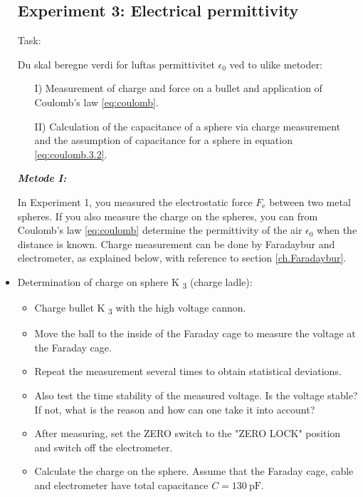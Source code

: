 \documentclass[../Elmag-labhefte-2020.tex]{subfiles}
\begin{document}
\begin{itemize}
\subsection{Experiment 3: Electrical permittivity}

Task: \ \
{\itsf Du skal beregne verdi for luftas permittivitet $\epsilon_0$ ved to ulike metoder:

\vspace{-4mm}
\begin{itemize}
    \item [I)] Measurement of charge and force on a bullet and application of Coulomb's law \eqref{eq:coulomb}.
    \item [II)] Calculation of the capacitance of a sphere via charge measurement and the assumption of capacitance for a sphere in equation \eqref{eq:coulomb.3.2}.
\end{itemize}
}

\textbf{\emph{Metode I:}}

In Experiment 1, you measured the electrostatic force $F_\text{e}$ between two metal spheres. If you also measure the charge on the spheres, you can from Coulomb's law \eqref{eq:coulomb} determine the permittivity of the air $\epsilon_0$ when the distance is known. Charge measurement can be done by Faradaybur and electrometer, as explained below, with reference to section \ref{ch.Faradaybur}.


%
    \item Determination of charge on sphere K \textsubscript{3} (charge ladle):
    \vspace{-2mm}
    \begin{itemize}
        \item Charge bullet K \textsubscript{3} with the high voltage cannon.
        \item Move the ball to the inside of the Faraday cage to measure the voltage at the Faraday cage.
        \item Repeat the measurement several times to obtain statistical deviations.
        \item Also test the time stability of the measured voltage. Is the voltage stable? If not, what is the reason and how can one take it into account?
        \item After measuring, set the ZERO switch to the "ZERO LOCK" position and switch off the electrometer.
        \item Calculate the charge on the sphere. Assume that the Faraday cage, cable and electrometer have total capacitance $C = \SI{130}{\pico\farad}$.
    \end{itemize}
\end{itemize}
\end{document}
